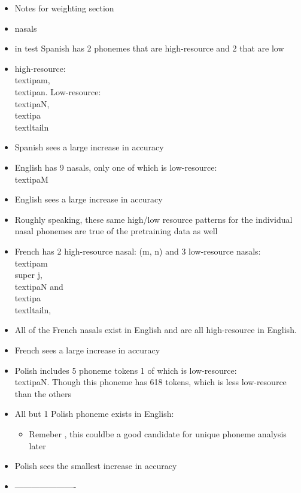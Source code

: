 \iffalse
\begin{itemize}
    \item Notes for weighting section
    \item nasals
    \item in test Spanish has 2 phonemes that are high-resource and 2 that are low
    \item high-resource: \\textipa{m}, \\textipa{n}. Low-resource: \\textipa{N}, \\textipa{\\textltailn}
    \item Spanish sees a large increase in accuracy
    \item English has 9 nasals, only one of which is low-resource: \\textipa{M}
    \item English sees a large increase in accuracy
    \item Roughly speaking, these same high/low resource patterns for the individual nasal phonemes are true of the pretraining data as well
    \item French has 2 high-resource nasal: \textipa(m, n) and 3 low-resource nasals: \\textipa{m\\super j}, \\textipa{N} and \\textipa{\\textltailn},
    \item All of the French nasals exist in English and are all high-resource in English.
    \item French sees a large increase in accuracy
    \item Polish includes 5 phoneme tokens 1 of which is low-resource: \\textipa{N}. Though this phoneme has 618 tokens, which is less low-resource than the others
    \item All but 1 Polish phoneme exists in English: \textipa{\|[{n}}
    \begin{itemize}
        \item Remeber \textipa{\|[{n}}, this couldbe a good candidate for unique phoneme analysis later
    \end{itemize}
    \item Polish sees the smallest increase in accuracy
    \item ----------------------

\end{itemize}
